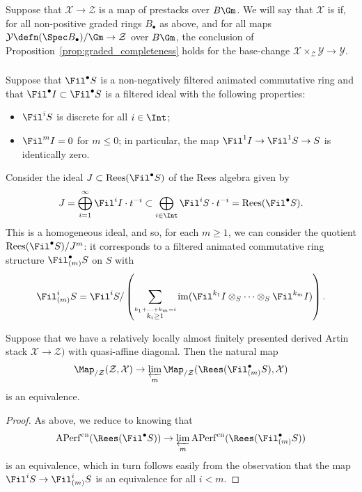 \documentclass[10pt]{amsart}
\begin{document}
\begin{definition}
\label{defn:graded_integrable}
Suppose that $\mathcal{X}\to \mathcal{Z}$ is a map of prestacks over $B\Gm$. We will say that $\mathcal{X}$ is  if, for all non-positive graded rings $B_\bullet$ as above, and for all maps $\mathcal{Y}\defn(\Spec B_\bullet)/\Gm\to \mathcal{Z}$ over $B\Gm$, the conclusion of Proposition~\ref{prop:graded_completeness} holds for the base-change $\mathcal{X}\times_{\mathcal{Z}}\mathcal{Y}\to \mathcal{Y}$.
\end{definition} 

\subsubsection{}
\label{subsubsec:filtered_completion}
Suppose that $\Fil^\bullet S$ is a non-negatively filtered animated commutative ring and that $\Fil^\bullet I\subset \Fil^\bullet S$ is a filtered ideal with the following properties:
\begin{itemize}
   \item $\Fil^iS$ is discrete for all $i\in \Int$;
   \item $\Fil^mI = 0$ for $m\le 0$; in particular, the map $\Fil^1I\to \Fil^1 S \to S$ is identically zero.
\end{itemize}
Consider the ideal $J\subset \mathrm{Rees}(\Fil^\bullet S)$ of the Rees algebra given by
\[
J = \bigoplus_{i=1}^\infty\Fil^iI\cdot t^{-i}\subset \bigoplus_{i\in \Int}\Fil^iS \cdot t^{-i}= \mathrm{Rees}(\Fil^\bullet S).
\]
This is a homogeneous ideal, and so, for each $m\ge 1$, we can consider the quotient $\mathrm{Rees}(\Fil^\bullet S)/J^m$: it corresponds to a filtered animated commutative ring structure $\Fil^\bullet_{(m)}S$ on $S$ with
\[
\Fil^i_{(m)}S = \Fil^i S/\left(\sum_{\stackrel{k_1+\ldots+k_m = i}{k_i\ge 1}}\mathrm{im}(\Fil^{k_1}I\otimes_S\cdots\otimes_S\Fil^{k_m}I)\right).
\]

\begin{proposition}
\label{prop:filtered_completeness}
Suppose that we have a relatively locally almost finitely presented derived Artin stack $\mathcal{X}\to \mathcal{Z})$ with quasi-affine diagonal. Then the natural map
\[
\Map_{/\mathcal{Z}}(\mathcal{Z},\mathcal{X})\to \varprojlim_m\Map_{/\mathcal{Z}}(\Rees(\Fil^\bullet_{(m)}S),\mathcal{X})
\]
is an equivalence.
\end{proposition} 
\begin{proof}
As above, we reduce to knowing that
\[
\mathrm{APerf}^{\mathrm{cn}}(\Rees(\Fil^\bullet S))\to \varprojlim_m\mathrm{APerf}^{\mathrm{cn}}(\Rees(\Fil^\bullet_{(m)}S))
\]
is an equivalence, which in turn follows easily from the observation that the map $\Fil^i S \to \Fil^i_{(m)}S$ is an equivalence for all $i<m$. 
\end{proof}
\end{document}

